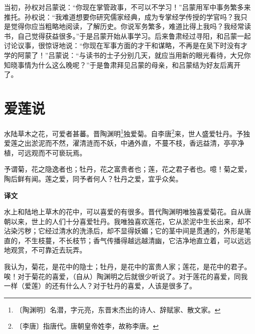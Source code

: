 \documentclass[12pt,UTF-8,openany,a4]{ctexbook}
\begin{document}
\vspace{1em}

\begin{large}\yiwen
    
    当初，孙权对吕蒙说：“你现在掌管政事，不可以不学习！”吕蒙用军中事务繁多来推托。孙权说：“我难道想要你研究儒家经典，成为专掌经学传授的学官吗？我只是觉得你应当粗略地阅读，了解历史。你说军务繁多，难道比得上我吗？我经常读书，自己觉得获益很多。”于是吕蒙开始从事学习。后来鲁肃经过寻阳，和吕蒙一起讨论议事，很惊讶地说：“你现在军事方面的才干和谋略，不再是在吴下时没有才学的阿蒙了！”吕蒙说：“与读书的士子分别几天，就应当用新的眼光看待，大兄你知晓事情为什么这么晚呢？”于是鲁肃拜见吕蒙的母亲，和吕蒙结为好友后离开了。
    

\end{large}

\chapter{爱莲说}

\begin{large}
    
    水陆草木之花，可爱者甚蕃。晋陶渊明\footnote{〔陶渊明〕\yiwen 名潜，字元亮，东晋末杰出的诗人、辞赋家、散文家。}独爱菊。自李唐\footnote{〔李唐〕\yiwen 指唐代。唐朝皇帝姓李，故称李唐。}来，世人盛爱牡丹。予独爱莲之出淤泥而不然，濯清涟而不妖，中通外直，不蔓不枝，香远益清，亭亭净植，可远观而不可亵玩焉。
    
    予谓菊，花之隐逸者也；牡丹，花之富贵者也；莲，花之君子者也。噫！菊之爱，陶后鲜有闻。莲之爱，同予者何人？牡丹之爱，宜乎众矣。

\end{large}

\newpage

\begin{Large}
    \noindent\textbf{译文}
\end{Large}

\vspace{1em}

\begin{large}
    \yiwen 
    水上和陆地上草木的花中，可以喜爱的有很多。晋代陶渊明唯独喜爱菊花。自从唐朝以来，世上的人们十分喜爱牡丹。我唯独喜欢莲花，它从淤泥中生长出来，却不沾染污秽；它经过清水的洗涤后，却不显得妖媚；它的茎中间是贯通的，外形是笔直的，不生枝蔓，不长枝节；香气传播得越远越清幽，它洁净地直立着，可以远远地观赏，不可靠近去玩弄。
    
    我认为，菊花，是花中的隐士；牡丹，是花中的富贵人家；莲花，是花中的君子。唉！对于菊花的喜爱，（自从）陶渊明之后就很少听说了。对于莲花的喜爱，同我一样（爱莲）的还有什么人？对于牡丹的喜爱，人该是很多了。
    
\end{large}
\end{document}
